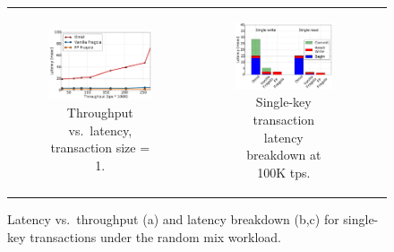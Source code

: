 \begin{figure}[t!]
\centering
\begin{tabular}{ccc}
      \begin{subfigure}[t]{0.5\textwidth}
      	\includegraphics[width=\textwidth]{figs/throughputlatency1.pdf}
	    \caption{Throughput vs.\ latency, transaction size = 1.}
        \label{fig:tl-1}      
      \end{subfigure} & 

      \begin{subfigure}[t]{0.5\textwidth}
      	\includegraphics[width=\textwidth]{figs/latency_PUTGET.pdf}
        \caption[]{Single-key transaction latency breakdown at 100K tps.}
        \label{fig:stack-brc}
      \end{subfigure}  & 

\end{tabular}
       \caption{Latency vs.\ throughput (a) and latency breakdown (b,c) for single-key transactions under the random mix workload. }
\end{figure}


